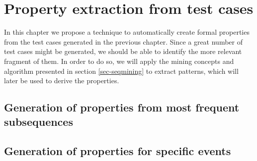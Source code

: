 \chapter{Property extraction from test cases}
\label{cap:propextract}

In this chapter we propose a technique to automatically create formal properties from the test cases generated in the previous chapter. Since a great number of test cases might be generated, we should be able to identify the more relevant fragment of them. In order to do so, we will apply the mining concepts and algorithm presented in section \ref{sec-seqmining} to extract patterns, which will later be used to derive the properties.



%


%





\section{Generation of properties from most frequent subsequences}

\section{Generation of properties for specific events}
